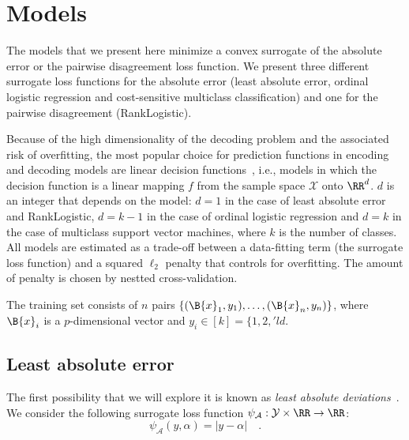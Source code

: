 
\section{Models}\label{sec:or_models}

The models that we present here minimize a convex surrogate of the absolute error or the pairwise disagreement loss function. We present three different surrogate loss functions for the absolute error (least absolute error, ordinal logistic regression and cost-sensitive multiclass classification) and one for the pairwise disagreement (RankLogistic). 

Because of the high dimensionality of the decoding problem and the associated risk of overfitting, the most popular choice for prediction functions in encoding and decoding models are linear decision functions~\citep{cox2003,laconte2005support, Sutao2011, thirion2006, Naselaris2011}, i.e., models in which the decision function is a linear mapping $f$ from the sample space $\mathcal{X}$ onto $\RR^d$. $d$ is an integer that depends on the model: $d=1$ in the case of least absolute error and RankLogistic, $d = k-1$ in the case of ordinal logistic regression and $d=k$ in the case of multiclass support vector machines, where $k$ is the number of classes. All models are estimated as a trade-off between a data-fitting term (the surrogate loss function) and a squared $\ell_2$ penalty that controls for overfitting. The amount of penalty is chosen by nestted cross-validation.

The training set consists of $n$ pairs $\{(\B{x}_1, y_1), \ldots, (\B{x}_n, y_n)\}$, where $\B{x}_i$ is a $p$-dimensional vector and $y_i \in [k] = \{1, 2, 'ld$.


\subsection{Least absolute error}


The first possibility that we will explore it is known as \emph{least absolute deviations}~\citep{bloomfield1980least, narula1982minimum}. We consider the following surrogate loss function $\psi_{\mathcal{A}}: \mathcal{Y} \times \RR \to \RR$:
$$
\psi_{\mathcal{A}}(y, \alpha) = |y - \alpha|  \quad.
$$

